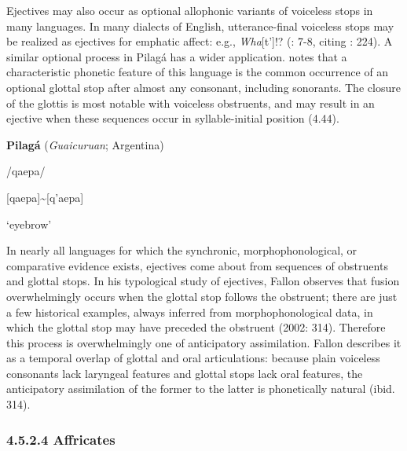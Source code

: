   Ejectives may also occur as optional allophonic variants of voiceless stops in many languages. In many dialects of English, utterance-final voiceless stops may be realized as ejectives for emphatic affect: e.g., \textit{Wha}[t’]!? (\citealt{Fallon2002}: 7-8, citing \citealt{Taylor1995}: 224). A similar optional process in Pilagá has a wider application. \citet{Vidal2001} notes that a characteristic phonetic feature of this language is the common occurrence of an optional glottal stop after almost any consonant, including sonorants. The closure of the glottis is most notable with voiceless obstruents, and may result in an ejective when these sequences occur in syllable-initial position (4.44).



\ea\label{ex:(4.44)}
  \textbf{Pilagá} (\textit{Guaicuruan}; Argentina)



/qaepa/



[qaepa]{\textasciitilde}[q’aepa]



‘eyebrow’



\citep[36]{Vidal2001}

\z


  In nearly all languages for which the synchronic, morphophonological, or comparative evidence exists, ejectives come about from sequences of obstruents and glottal stops. In his typological study of ejectives, Fallon observes that fusion overwhelmingly occurs when the glottal stop follows the obstruent; there are just a few historical examples, always inferred from morphophonological data, in which the glottal stop may have preceded the obstruent (2002: 314). Therefore this process is overwhelmingly one of anticipatory assimilation. Fallon describes it as a temporal overlap of glottal and oral articulations: because plain voiceless consonants lack laryngeal features and glottal stops lack oral features, the anticipatory assimilation of the former to the latter is phonetically natural (ibid. 314).


\subsubsection{\textbf{4.5.2.4} \textbf{Affricates}}

